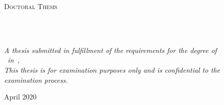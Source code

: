 \documentclass[11pt,english,doublespacing,liststotoc,tocbibind,headsepline]{MastersDoctoralThesis}\usepackage[]{graphicx}\usepackage[]{color}
\author{Tom Mitchell Elliott} %
\begin{document}
\frontmatter %

\pagestyle{plain} %


\begin{titlepage}
\begin{center}

\vspace*{.06\textheight}
{\scshape\LARGE \univname\par}\vspace{1.5cm} %
\textsc{\Large Doctoral Thesis}\\[0.5cm] %

\HRule \\[0.4cm] %
{\huge \bfseries \ttitle\par}\vspace{0.4cm} %
\HRule \\[1.5cm] %


\Large\authorname %

\vfill

\large \textit{A thesis submitted in fulfillment of the requirements %
for the degree of\\ \degreename\ in\ \subjectname, \univname}\\[0.3cm]

\textit{This thesis is for examination purposes only and is confidential %
to the examination process.}


\vspace{1cm}
{\large April 2020}%

\vfill
\end{center}
\end{titlepage}

\end{document}
